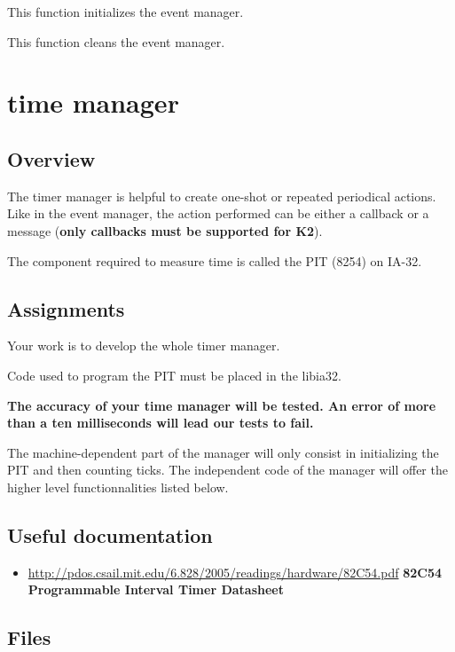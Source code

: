 	 {
	   This function initializes the event manager.
	 }

	 {
	   This function cleans the event manager.
	 }


%
%

\newpage

\section{time manager}
\subsection*{Overview}

The timer manager is helpful to create one-shot or repeated
periodical actions. Like in the event manager, the action
performed can be either a callback or a message (\textbf{only
  callbacks must be supported for K2}).

The component required to measure time is called the PIT (8254) on
IA-32.

\subsection*{Assignments}

Your work is to develop the whole timer manager.

Code used to program the PIT must be placed in the libia32.

\textbf{The accuracy of your time manager will be tested. An error
  of more than a ten milliseconds will lead our tests to fail.}

The machine-dependent part of the manager will only consist in
initializing the PIT and then counting ticks. The independent code
of the manager will offer the higher level functionnalities listed
below.

\subsection*{Useful documentation}

\begin{itemize}
  \item \url{http://pdos.csail.mit.edu/6.828/2005/readings/hardware/82C54.pdf}
	    {\textbf{82C54 Programmable Interval Timer Datasheet}}
\end{itemize}

\subsection*{Files}
